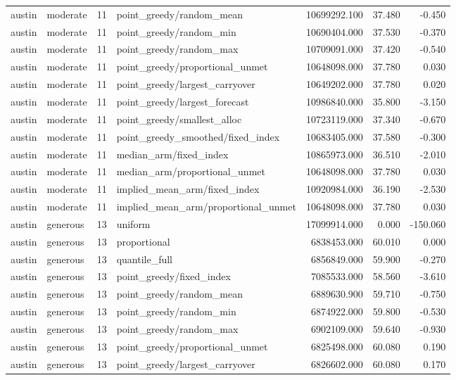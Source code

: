 \begin{tabular}{llrlrrr}
austin & moderate & 11 & point\_greedy/random\_mean & 10699292.100 & 37.480 & -0.450 \\
austin & moderate & 11 & point\_greedy/random\_min & 10690404.000 & 37.530 & -0.370 \\
austin & moderate & 11 & point\_greedy/random\_max & 10709091.000 & 37.420 & -0.540 \\
austin & moderate & 11 & point\_greedy/proportional\_unmet & 10648098.000 & 37.780 & 0.030 \\
austin & moderate & 11 & point\_greedy/largest\_carryover & 10649202.000 & 37.780 & 0.020 \\
austin & moderate & 11 & point\_greedy/largest\_forecast & 10986840.000 & 35.800 & -3.150 \\
austin & moderate & 11 & point\_greedy/smallest\_alloc & 10723119.000 & 37.340 & -0.670 \\
austin & moderate & 11 & point\_greedy\_smoothed/fixed\_index & 10683405.000 & 37.580 & -0.300 \\
austin & moderate & 11 & median\_arm/fixed\_index & 10865973.000 & 36.510 & -2.010 \\
austin & moderate & 11 & median\_arm/proportional\_unmet & 10648098.000 & 37.780 & 0.030 \\
austin & moderate & 11 & implied\_mean\_arm/fixed\_index & 10920984.000 & 36.190 & -2.530 \\
austin & moderate & 11 & implied\_mean\_arm/proportional\_unmet & 10648098.000 & 37.780 & 0.030 \\
austin & generous & 13 & uniform & 17099914.000 & 0.000 & -150.060 \\
austin & generous & 13 & proportional & 6838453.000 & 60.010 & 0.000 \\
austin & generous & 13 & quantile\_full & 6856849.000 & 59.900 & -0.270 \\
austin & generous & 13 & point\_greedy/fixed\_index & 7085533.000 & 58.560 & -3.610 \\
austin & generous & 13 & point\_greedy/random\_mean & 6889630.900 & 59.710 & -0.750 \\
austin & generous & 13 & point\_greedy/random\_min & 6874922.000 & 59.800 & -0.530 \\
austin & generous & 13 & point\_greedy/random\_max & 6902109.000 & 59.640 & -0.930 \\
austin & generous & 13 & point\_greedy/proportional\_unmet & 6825498.000 & 60.080 & 0.190 \\
austin & generous & 13 & point\_greedy/largest\_carryover & 6826602.000 & 60.080 & 0.170 \\

\end{tabular}
